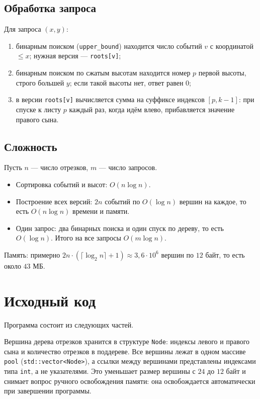 \subsection*{Обработка запроса}
Для запроса $(x, y)$:
\begin{enumerate}
\item бинарным поиском (\texttt{upper\_bound}) находится число событий $v$ с координатой $\le x$; нужная версия --- \texttt{roots[v]};
\item бинарным поиском по сжатым высотам находится номер $p$ первой высоты, строго большей $y$; если такой высоты нет, ответ равен $0$;
\item в версии \texttt{roots[v]} вычисляется сумма на суффиксе индексов $[p, k - 1]$: при спуске к листу $p$ каждый раз,
когда идём влево, прибавляется значение правого сына.
\end{enumerate}

\subsection*{Сложность}
Пусть $n$ --- число отрезков, $m$ --- число запросов.
\begin{itemize}
\item Сортировка событий и высот: $O(n \log n)$.
\item Построение всех версий: $2n$ событий по $O(\log n)$ вершин на каждое, то есть $O(n \log n)$ времени и памяти.
\item Один запрос: два бинарных поиска и один спуск по дереву, то есть $O(\log n)$. Итого на все запросы $O(m \log n)$.
\end{itemize}
Память: примерно $2n \cdot (\lceil \log_2 n \rceil + 1) \approx 3{,}6 \cdot 10^6$ вершин по $12$ байт, то есть около $43$ МБ.

\pagebreak

\section{Исходный код}
Программа состоит из следующих частей.

Вершина дерева отрезков хранится в структуре \texttt{Node}: индексы левого и правого сына и количество отрезков в поддереве.
Все вершины лежат в одном массиве \texttt{pool} (\texttt{std::vector<Node>}), а ссылки между вершинами представлены
индексами типа \texttt{int}, а не указателями. Это уменьшает размер вершины с $24$ до $12$ байт и снимает вопрос ручного
освобождения памяти: она освобождается автоматически при завершении программы.

